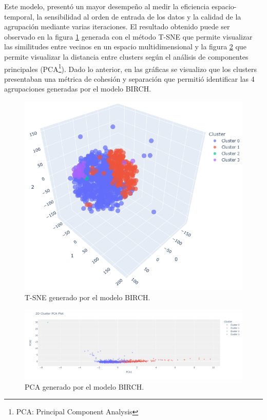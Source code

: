 Este modelo, presentó un mayor desempeño al medir la eficiencia espacio-temporal, la sensibilidad al orden de entrada de los datos y la calidad de la agrupación mediante varias iteraciones. El resultado obtenido puede ser observado en la figura \ref{BIRCH_TSNE} generada con el método T-SNE que permite visualizar las similitudes entre vecinos en un espacio multidimensional y la figura \ref{BIRCH_PCA} que permite visualizar la distancia entre clusters según el análisis de componentes principales (PCA\footnote{PCA: Principal Component Analysis}). Dado lo anterior, en las gráficas se visualizo que los clusters presentaban una métrica de cohesión y separación que permitió identificar las 4 agrupaciones generadas por el modelo BIRCH.

\begin{figure}
	\centering
	\includegraphics[width=0.5
	\linewidth]{NOTEBOOK/IMAGENES_CLUSTERING/8_TNSE_Birch_Clustering}
	\caption{T-SNE generado por el modelo BIRCH.}
	\label{BIRCH_TSNE}
\end{figure}

\begin{figure}
	\centering
	\includegraphics[width=1
	\linewidth]{NOTEBOOK/IMAGENES_CLUSTERING/8_PCA_Birch_Clustering}
	\caption{PCA generado por el modelo BIRCH.}
	\label{BIRCH_PCA}
\end{figure}

